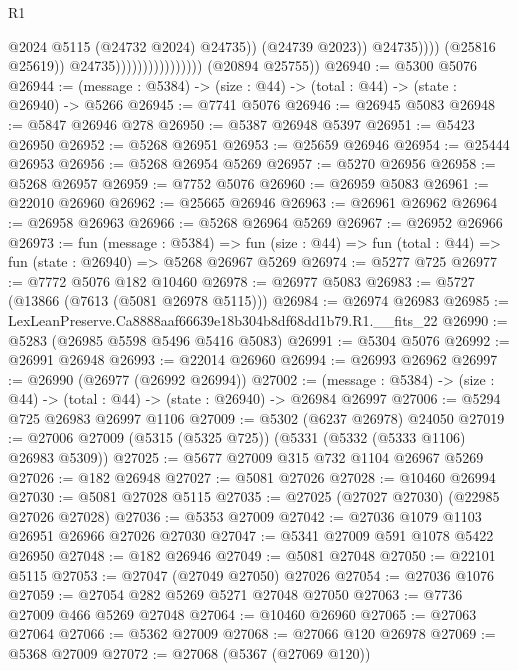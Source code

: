 \begin{lexlean}{R1}
\begin{coremodule}
                                                      @2024
                                                      @5115
                                                      (@24732 @2024)
                                                      @24735))
                                                  (@24739 @2023))
                                                @24735))))
                                        (@25816 @25619))
                                      @24735))))))))))))))))
      (@20894 @25755))
@26940 := @5300 @5076
@26944 := (message : @5384) -> (size : @44) -> (total : @44) -> (state : @26940) -> @5266
@26945 := @7741 @5076
@26946 := @26945 @5083
@26948 := @5847 @26946 @278
@26950 := @5387 @26948 @5397
@26951 := @5423 @26950
@26952 := @5268 @26951
@26953 := @25659 @26946
@26954 := @25444 @26953
@26956 := @5268 @26954 @5269
@26957 := @5270 @26956
@26958 := @5268 @26957
@26959 := @7752 @5076
@26960 := @26959 @5083
@26961 := @22010 @26960
@26962 := @25665 @26946
@26963 := @26961 @26962
@26964 := @26958 @26963
@26966 := @5268 @26964 @5269
@26967 := @26952 @26966
@26973 := fun (message : @5384) =>
  fun (size : @44) => fun (total : @44) => fun (state : @26940) => @5268 @26967 @5269
@26974 := @5277 @725
@26977 := @7772 @5076 @182 @10460
@26978 := @26977 @5083
@26983 := @5727 (@13866 (@7613 (@5081 @26978 @5115)))
@26984 := @26974 @26983
@26985 := LexLeanPreserve.Ca8888aaf66639e18b304b8df68dd1b79.R1.__fits_22
@26990 := @5283 (@26985 @5598 @5496 @5416 @5083)
@26991 := @5304 @5076
@26992 := @26991 @26948
@26993 := @22014 @26960
@26994 := @26993 @26962
@26997 := @26990 (@26977 (@26992 @26994))
@27002 := (message : @5384) -> (size : @44) -> (total : @44) -> (state : @26940) -> @26984 @26997
@27006 := @5294 @725 @26983 @26997 @1106
@27009 := @5302 (@6237 @26978) @24050
@27019 := @27006 @27009 (@5315 (@5325 @725)) (@5331 (@5332 (@5333 @1106) @26983 @5309))
@27025 := @5677 @27009 @315 @732 @1104 @26967 @5269
@27026 := @182 @26948
@27027 := @5081 @27026
@27028 := @10460 @26994
@27030 := @5081 @27028 @5115
@27035 := @27025 (@27027 @27030) (@22985 @27026 @27028)
@27036 := @5353 @27009
@27042 := @27036 @1079 @1103 @26951 @26966 @27026 @27030
@27047 := @5341 @27009 @591 @1078 @5422 @26950
@27048 := @182 @26946
@27049 := @5081 @27048
@27050 := @22101 @5115
@27053 := @27047 (@27049 @27050) @27026
@27054 := @27036 @1076
@27059 := @27054 @282 @5269 @5271 @27048 @27050
@27063 := @7736 @27009 @466 @5269 @27048
@27064 := @10460 @26960
@27065 := @27063 @27064
@27066 := @5362 @27009
@27068 := @27066 @120 @26978
@27069 := @5368 @27009
@27072 := @27068 (@5367 (@27069 @120))

\end{coremodule}
\end{lexlean}
